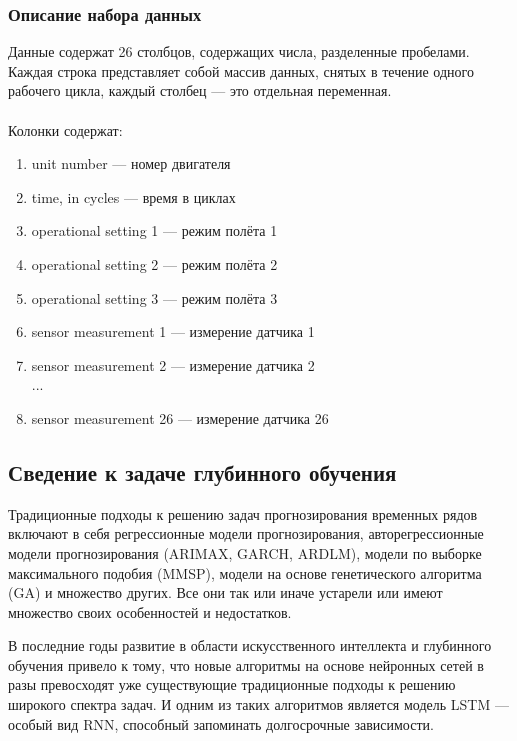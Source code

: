 \documentclass[14pt]{extarticle}
\begin{document}
\subsubsection{Описание набора данных}

Данные содержат 26 столбцов, содержащих числа, разделенные пробелами. Каждая строка представляет собой массив данных, снятых в течение одного рабочего цикла, каждый столбец --- это отдельная переменная.
\\
\\
Колонки содержат:
\begin{enumerate}
	\item unit number --- номер двигателя
	\item time, in cycles --- время в циклах
	\item operational setting 1 --- режим полёта 1
	\item operational setting 2 --- режим полёта 2
	\item operational setting 3 --- режим полёта 3
	\item sensor measurement 1 --- измерение датчика 1	
	\item sensor measurement 2 --- измерение датчика 2
	\\
	...
	\setcounter{enumi}{25}
	\item sensor measurement 26 --- измерение датчика 26
\end{enumerate}

\subsection{Сведение к задаче глубинного обучения} 

Традиционные подходы к решению задач прогнозирования временных рядов включают в себя регрессионные модели прогнозирования, авторегрессионные модели прогнозирования (ARIMAX, GARCH, ARDLM), модели по выборке максимального подобия (MMSP), модели на основе генетического алгоритма (GA) и множество других. Все они так или иначе устарели или имеют множество своих особенностей и недостатков. 

В последние годы развитие в области искусственного интеллекта и глубинного обучения привело к тому, что новые алгоритмы на основе нейронных сетей в разы превосходят уже существующие традиционные подходы к решению широкого спектра задач. И одним из таких алгоритмов является модель LSTM --- особый вид RNN, способный запоминать долгосрочные зависимости. 

\newpage
\end{document}
